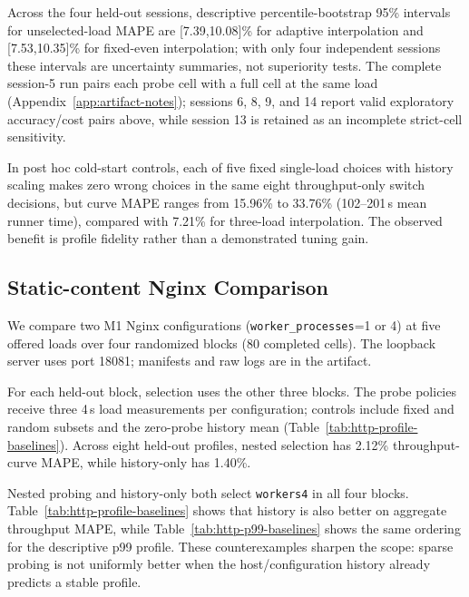 \documentclass[sigconf, review, anonymous, balance=false]{acmart}
\begin{document}
Across the four held-out sessions, descriptive percentile-bootstrap 95\% intervals for unselected-load MAPE are [7.39,10.08]\% for adaptive interpolation and [7.53,10.35]\% for fixed-even interpolation; with only four independent sessions these intervals are uncertainty summaries, not superiority tests. The complete session-5 run pairs each probe cell with a full cell at the same load (Appendix~\ref{app:artifact-notes}); sessions 6, 8, 9, and 14 report valid exploratory accuracy/cost pairs above, while session 13 is retained as an incomplete strict-cell sensitivity.

In post hoc cold-start controls, each of five fixed single-load choices with history scaling makes zero wrong choices in the same eight throughput-only switch decisions, but curve MAPE ranges from 15.96\% to 33.76\% (102--201\,s mean runner time), compared with 7.21\% for three-load interpolation. The observed benefit is profile fidelity rather than a demonstrated tuning gain.


\subsection{Static-content Nginx Comparison}
\label{subsec:nginx-counterexample}
We compare two M1 Nginx configurations (\texttt{worker\_processes}=1 or 4) at five offered loads over four randomized blocks (80 completed cells). The loopback server uses port 18081; manifests and raw logs are in the artifact.

For each held-out block, selection uses the other three blocks. The probe policies receive three 4\,s load measurements per configuration; controls include fixed and random subsets and the zero-probe history mean (Table~\ref{tab:http-profile-baselines}). Across eight held-out profiles, nested selection has 2.12\% throughput-curve MAPE, while history-only has 1.40\%.

Nested probing and history-only both select \texttt{workers4} in all four blocks. Table~\ref{tab:http-profile-baselines} shows that history is also better on aggregate throughput MAPE, while Table~\ref{tab:http-p99-baselines} shows the same ordering for the descriptive p99 profile. These counterexamples sharpen the scope: sparse probing is not uniformly better when the host/configuration history already predicts a stable profile.
\end{document}
